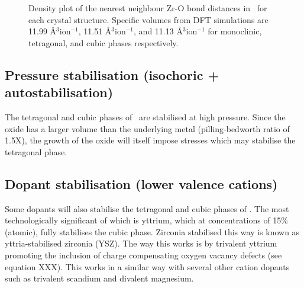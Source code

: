\begin{figure}
\begin{center}
		\caption{Density plot of the nearest neighbour Zr-O bond distances in \zirconia\ for each crystal structure. Specific volumes from DFT simulations are 11.99 \r{A}$^{3}$ion$^{-1}$, 11.51 \r{A}$^{3}$ion$^{-1}$, and 11.13 \r{A}$^{3}$ion$^{-1}$ for monoclinic, tetragonal, and cubic phases respectively.}
		\label{figure:zrobonddistance}
	\end{center}
\end{figure}


\subsection{Pressure stabilisation (isochoric + autostabilisation)}

The tetragonal and cubic phases of \zirconia\ are stabilised at high pressure. Since the oxide has a larger volume than the underlying metal (pilling-bedworth ratio of 1.5X), the growth of the oxide will itself impose stresses which may stabilise the tetragonal phase.

\subsection{Dopant stabilisation (lower valence cations)}

Some dopants will also stabilise the tetragonal and cubic phases of \zirconia. The most technologically significant of which is yttrium, which at concentrations of 15\% (atomic), fully stabilises the cubic phase. Zirconia stabilised this way is known as yttria-stabilised zirconia (YSZ). The way this works is by trivalent yttrium promoting the inclusion of charge compensating oxygen vacancy defects (see equation XXX). This works in a similar way with several other cation dopants such as trivalent scandium and divalent magnesium.

